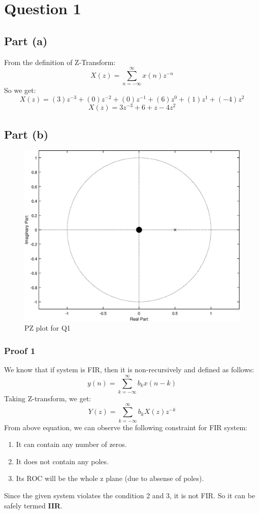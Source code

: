\documentclass[12pt,letterpaper]{article}
\begin{document}
\section*{Question 1}
\subsection*{Part (a)}
From the definition of Z-Transform: 
\[
    X(z)= \sum_{n=-\infty}^{\infty} x(n)z^{-n}
\]
So we get: 
\[
    X(z) = (3)z^{-3} + (0)z^{-2} + (0)z^{-1} + (6)z^{0} + (1)z^{1} + (-4)z^{2}
\]
\[
\boxed{
X(z) = 3z^{-3} +  6 + z  -4z^{2}
}
\]

\subsection*{Part (b)}
\begin{figure}[h]
    \centering
    \includegraphics[scale=0.5]{figures/q1task2.eps}
    \caption{PZ plot for Q1}
    \label{PZq1}
\end{figure}
\subsubsection*{Proof 1}
We know that if system is FIR, then it is non-recursively and defined as follows: 
\[
    y(n)=\sum^{\infty}_{k=-\infty} b_k x(n-k)
\]
Taking Z-transform, we get: 
\[
    Y(z) = \sum^{\infty}_{k=-\infty} b_k X(z)z^{-k}
\]
From above equation, we can observe the following constraint for FIR system: 
\begin{enumerate}
    \item It can contain any number of zeros. 
    \item It does not contain any poles.
    \item Its ROC will be the whole z plane (due to absense of poles).
\end{enumerate}
Since the given system violates the condition 2 and 3, it is not FIR. So it  can be safely termed \textbf{IIR}.
\end{document}
